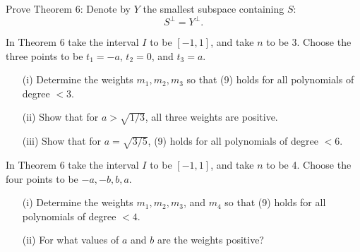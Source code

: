   \begin{exercise}[Lax 2.3] 
    Prove Theorem 6: Denote by $Y$ the smallest subspace containing $S$:
    \[S^\perp = Y^\perp.\]
  \end{exercise}

  \begin{exercise}[Lax 2.4] 
    In Theorem 6 take the interval $I$ to be $[-1, 1]$, and take $n$ to be 3. Choose the three points to be $t_1 = -a$, $t_2 = 0$, and $t_3 = a$.
    
    \begin{enumerate}
      \item[(i)] Determine the weights $m_1, m_2, m_3$ so that (9) holds for all polynomials of degree $<3$.
      \item[(ii)] Show that for $a > \sqrt{1/3}$, all three weights are positive.
      \item[(iii)] Show that for $a = \sqrt{3/5}$, (9) holds for all polynomials of degree $<6$.
    \end{enumerate}
  \end{exercise}

  \begin{exercise}[Lax 2.5] 
    In Theorem 6 take the interval $I$ to be $[-1, 1]$, and take $n$ to be 4. Choose the four points to be $-a, -b, b, a$.
    
    \begin{enumerate}
      \item[(i)] Determine the weights $m_1, m_2, m_3$, and $m_4$ so that (9) holds for all polynomials of degree $<4$.
      \item[(ii)] For what values of $a$ and $b$ are the weights positive?
    \end{enumerate}
  \end{exercise}

